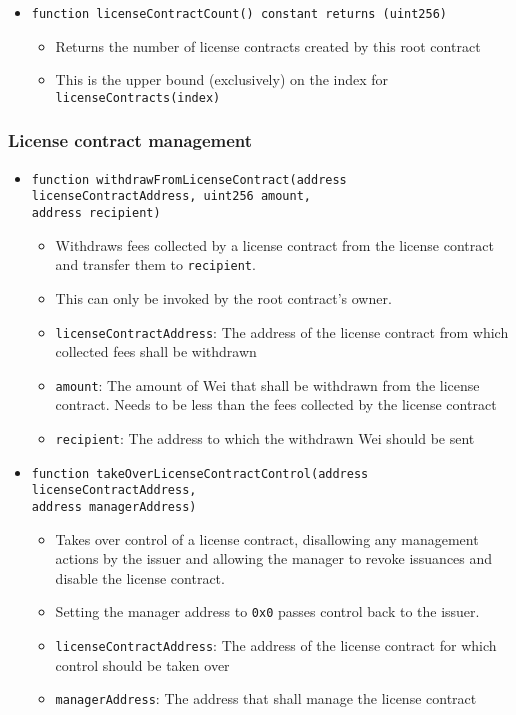 \documentclass[a4paper]{article}
\begin{document}
\begin{itemize}
  \item \texttt{function licenseContractCount() constant returns (uint256)}
  \begin{itemize}
    \item Returns the number of license contracts created by this root contract
    \item This is the upper bound (exclusively) on the index for \texttt{licenseContracts(index)}
  \end{itemize}
\end{itemize}

\subsubsection{License contract management}

\begin{itemize}
  \item \texttt{function withdrawFromLicenseContract(address licenseContractAddress, uint256 amount, \\address recipient)}
  \begin{itemize}
    \item Withdraws fees collected by a license contract from the license contract and transfer them to \texttt{recipient}.
    \item This can only be invoked by the root contract's owner.
    \item \texttt{licenseContractAddress}: The address of the license contract from which collected fees shall be withdrawn
    \item \texttt{amount}: The amount of Wei that shall be withdrawn from the license contract. Needs to be less than the fees collected by the license contract
    \item \texttt{recipient}: The address to which the withdrawn Wei should be sent
  \end{itemize}
  
  \item \texttt{function takeOverLicenseContractControl(address licenseContractAddress, \\address managerAddress)}
  \begin{itemize}
    \item Takes over control of a license contract, disallowing any management actions by the issuer and allowing the manager to revoke issuances and disable the license contract.
    \item Setting the manager address to \texttt{0x0} passes control back to the issuer.
    \item \texttt{licenseContractAddress}: The address of the license contract for which control should be taken over
    \item \texttt{managerAddress}: The address that shall manage the license contract
  \end{itemize}
\end{itemize}
\end{document}
